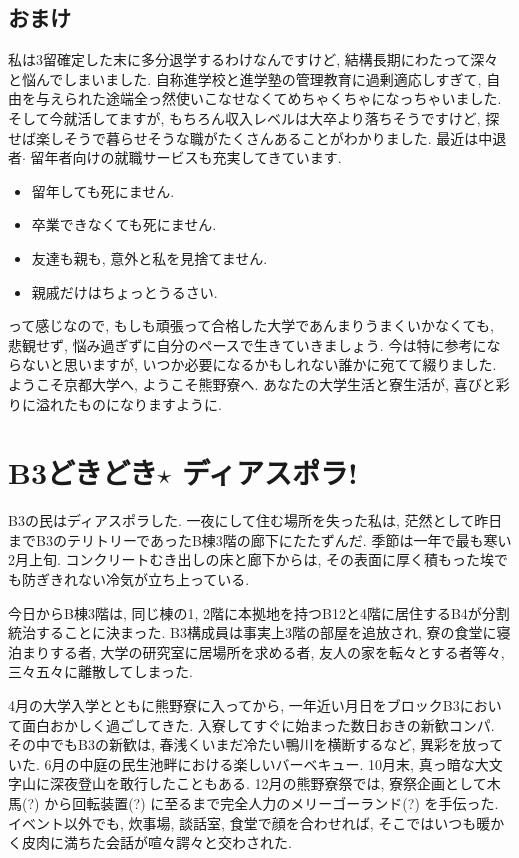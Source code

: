 \documentclass[10pt,b5jsbook,dvips,dvipdfmx,openany]{jsbook}
\theoremstyle{definition}
\begin{document}
		\subsection{おまけ}
		私は3留確定した末に多分退学するわけなんですけど, 結構長期にわたって深々と悩んでしまいました. 自称進学校と進学塾の管理教育に過剰適応しすぎて, 自由を与えられた途端全っ然使いこなせなくてめちゃくちゃになっちゃいました. そして今就活してますが, もちろん収入レベルは大卒より落ちそうですけど, 探せば楽しそうで暮らせそうな職がたくさんあることがわかりました. 最近は中退者$ \cdot $ 留年者向けの就職サービスも充実してきています. 
		\begin{itemize}
		\item 留年しても死にません. 
		\item 卒業できなくても死にません. 
		\item 友達も親も, 意外と私を見捨てません. 
		\item 親戚だけはちょっとうるさい. 
		\end{itemize}
		って感じなので, もしも頑張って合格した大学であんまりうまくいかなくても, 悲観せず, 悩み過ぎずに自分のペースで生きていきましょう. 今は特に参考にならないと思いますが, いつか必要になるかもしれない誰かに宛てて綴りました. 
        ようこそ京都大学へ, ようこそ熊野寮へ. あなたの大学生活と寮生活が, 喜びと彩りに溢れたものになりますように. 


	\section{B3どきどき$ \star$ ディアスポラ! }

	B3の民はディアスポラした. 一夜にして住む場所を失った私は, 茫然として昨日までB3のテリトリーであったB棟3階の廊下にたたずんだ. 季節は一年で最も寒い2月上旬. コンクリートむき出しの床と廊下からは, その表面に厚く積もった埃でも防ぎきれない冷気が立ち上っている. 

	今日からB棟3階は, 同じ棟の1, 2階に本拠地を持つB12と4階に居住するB4が分割統治することに決まった. B3構成員は事実上3階の部屋を追放され, 寮の食堂に寝泊まりする者, 大学の研究室に居場所を求める者, 友人の家を転々とする者等々, 三々五々に離散してしまった. 

	4月の大学入学とともに熊野寮に入ってから, 一年近い月日をブロックB3において面白おかしく過ごしてきた. 入寮してすぐに始まった数日おきの新歓コンパ. その中でもB3の新歓は, 春浅くいまだ冷たい鴨川を横断するなど, 異彩を放っていた. 6月の中庭の民生池畔における楽しいバーベキュー. 10月末, 真っ暗な大文字山に深夜登山を敢行したこともある. 12月の熊野寮祭では, 寮祭企画として木馬(?) から回転装置(?) に至るまで完全人力のメリーゴーランド(?) を手伝った. イベント以外でも, 炊事場, 談話室, 食堂で顔を合わせれば, そこではいつも暖かく皮肉に満ちた会話が喧々諤々と交わされた. 
\end{document}

